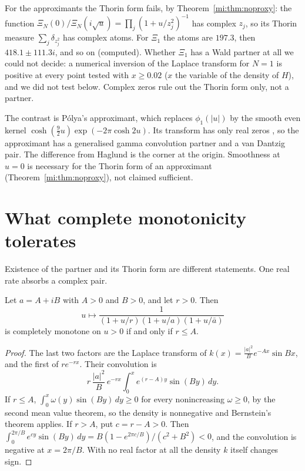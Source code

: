 For the approximants the Thorin form fails, by Theorem~\ref{mi:thm:noproxy}: the function $\Xi_N(0)/\Xi_N(i\sqrt u)=\prod_j(1+u/z_j^2)^{-1}$ has complex $z_j$, so its Thorin measure $\sum_j\delta_{z_j^2}$ has complex atoms. For $\Xi_1$ the atoms are $197.3$, then $418.1\pm111.3i$, and so on (computed). Whether $\Xi_1$ has a Wald partner at all we could not decide: a numerical inversion of the Laplace transform for $N=1$ is positive at every point tested with $x\ge0.02$ ($x$ the variable of the density of $H$), and we did not test below. Complex zeros rule out the Thorin form only, not a partner.

The contrast is P\'olya's approximant, which replaces $\phi_1(|u|)$ by the smooth even kernel $\cosh(\tfrac92u)\exp(-2\pi\cosh2u)$. Its transform has only real zeros \cite{Polya}, so the approximant has a generalised gamma convolution partner and a van Dantzig pair. The difference from Haglund is the corner at the origin. Smoothness at $u=0$ is necessary for the Thorin form of an approximant (Theorem~\ref{mi:thm:noproxy}), not claimed sufficient.

\section{What complete monotonicity tolerates}\label{mh:sec:tolerance}

Existence of the partner and its Thorin form are different statements. One real rate absorbs a complex pair.

\begin{proposition}\label{mh:prop:absorb}
Let $a=A+iB$ with $A>0$ and $B>0$, and let $r>0$. Then
\[
u\mapsto\frac{1}{(1+u/r)(1+u/a)(1+u/\bar a)}
\]
is completely monotone on $u>0$ if and only if $r\le A$.
\end{proposition}

\begin{proof}
The last two factors are the Laplace transform of $k(x)=\frac{|a|^2}{B}e^{-Ax}\sin Bx$, and the first of $re^{-rx}$. Their convolution is
\[r\,\frac{|a|^2}{B}\,e^{-rx}\int_0^xe^{(r-A)y}\sin(By)\,dy.\]
If $r\le A$, $\int_0^x\omega(y)\sin(By)\,dy\ge0$ for every nonincreasing $\omega\ge0$, by the second mean value theorem, so the density is nonnegative and Bernstein's theorem applies. If $r>A$, put $c=r-A>0$. Then $\int_0^{2\pi/B}e^{cy}\sin(By)\,dy=B(1-e^{2\pi c/B})/(c^2+B^2)<0$, and the convolution is negative at $x=2\pi/B$. With no real factor at all the density $k$ itself changes sign.
\end{proof}

